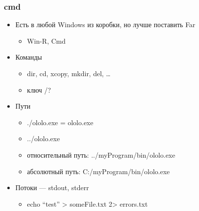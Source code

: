 \documentclass[xetex,mathserif,serif]{beamer}
\begin{document}
    \begin{frame}
        \frametitle{cmd}
        \begin{itemize}
            \item Есть в любой Windows из коробки, но лучше поставить Far
            \begin{itemize}
                \item Win-R, Cmd
            \end{itemize}
            \item Команды
            \begin{itemize}
                \item dir, cd, xcopy, mkdir, del, …
                \item ключ /?
            \end{itemize}
            \item Пути
            \begin{itemize}
                \item ./ololo.exe = ololo.exe
                \item ../ololo.exe
                \item относительный путь: ../myProgram/bin/ololo.exe
                \item абсолютный путь: C:/myProgram/bin/ololo.exe
            \end{itemize}
            \item Потоки --- stdout, stderr
            \begin{itemize}
                \item echo ``test'' > someFile.txt 2> errors.txt
            \end{itemize}
        \end{itemize}
    \end{frame}
\end{document}
